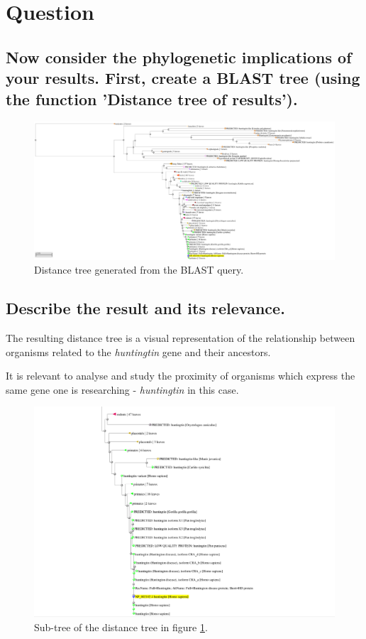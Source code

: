 \section{Question}

\subsection{Now consider the phylogenetic implications of your results. First, create a BLAST tree (using the function 'Distance tree of results').}

\begin{figure}[ht]
    \centering
    \includegraphics[width=\linewidth]{res/blast-tree.pdf}
    \caption{Distance tree generated from the BLAST query.}
    \label{fig:blast-tree}
\end{figure}


\subsection{Describe the result and its relevance.}

The resulting distance tree is a visual representation of the relationship between organisms related to the \textit{huntingtin} gene and their ancestors.

It is relevant to analyse and study the proximity of organisms which express the same gene one is researching - \textit{huntingtin} in this case.

\begin{figure}[ht]
    \centering
    \includegraphics[width=0.7\linewidth]{res/blast-tree-zoom.png}
    \caption{Sub-tree of the distance tree in figure \ref{fig:blast-tree}.}
    \label{fig:blast-subtree}
\end{figure}

